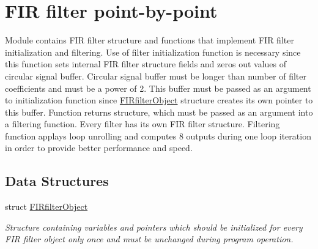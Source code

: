 \hypertarget{group___f_i_rfilter_pt_by_pt}{}\section{F\+IR filter point-\/by-\/point}
\label{group___f_i_rfilter_pt_by_pt}


Module contains F\+IR filter structure and functions that implement F\+IR filter initialization and filtering. Use of filter initialization function is necessary since this function sets internal F\+IR filter structure fields and zeros out values of circular signal buffer. Circular signal buffer must be longer than number of filter coefficients and must be a power of 2. This buffer must be passed as an argument to initialization function since \mbox{\hyperlink{struct_f_i_rfilter_object}{F\+I\+Rfilter\+Object}} structure creates it\textquotesingle{}s own pointer to this buffer. Function returns structure, which must be passed as an argument into a filtering function. Every filter has it\textquotesingle{}s own F\+IR filter structure. Filtering function applays loop unrolling and computes 8 outputs during one loop iteration in order to provide better performance and speed.  


\subsection*{Data Structures}
\begin{DoxyCompactItemize}
\item 
struct \mbox{\hyperlink{struct_f_i_rfilter_object}{F\+I\+Rfilter\+Object}}
\begin{DoxyCompactList}\small\item\em Structure containing variables and pointers which should be initialized for every F\+IR filter object only once and must be unchanged during program operation. \end{DoxyCompactList}\end{DoxyCompactItemize}
